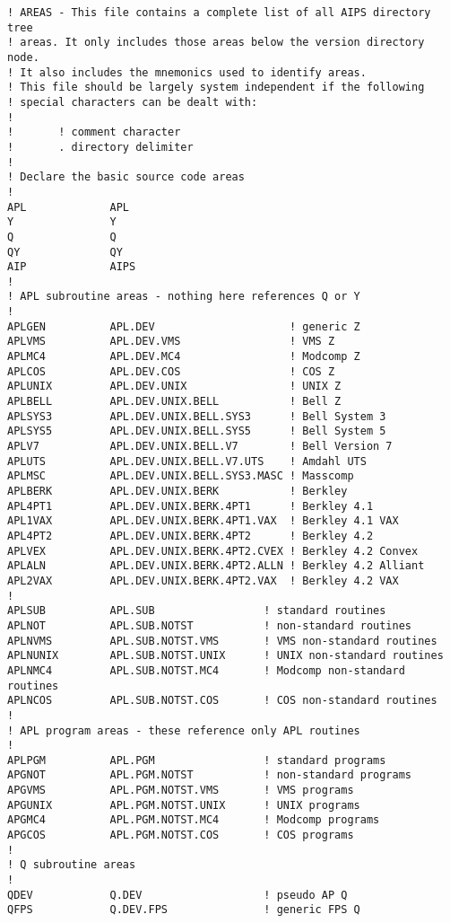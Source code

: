\begin{verbatim}
! AREAS - This file contains a complete list of all AIPS directory tree
! areas. It only includes those areas below the version directory node.
! It also includes the mnemonics used to identify areas.
! This file should be largely system independent if the following
! special characters can be dealt with:
!
!       ! comment character
!       . directory delimiter
!
! Declare the basic source code areas
!
APL             APL
Y               Y
Q               Q
QY              QY
AIP             AIPS
!
! APL subroutine areas - nothing here references Q or Y
!
APLGEN          APL.DEV                     ! generic Z
APLVMS          APL.DEV.VMS                 ! VMS Z
APLMC4          APL.DEV.MC4                 ! Modcomp Z
APLCOS          APL.DEV.COS                 ! COS Z
APLUNIX         APL.DEV.UNIX                ! UNIX Z
APLBELL         APL.DEV.UNIX.BELL           ! Bell Z
APLSYS3         APL.DEV.UNIX.BELL.SYS3      ! Bell System 3
APLSYS5         APL.DEV.UNIX.BELL.SYS5      ! Bell System 5
APLV7           APL.DEV.UNIX.BELL.V7        ! Bell Version 7
APLUTS          APL.DEV.UNIX.BELL.V7.UTS    ! Amdahl UTS
APLMSC          APL.DEV.UNIX.BELL.SYS3.MASC ! Masscomp
APLBERK         APL.DEV.UNIX.BERK           ! Berkley
APL4PT1         APL.DEV.UNIX.BERK.4PT1      ! Berkley 4.1
APL1VAX         APL.DEV.UNIX.BERK.4PT1.VAX  ! Berkley 4.1 VAX
APL4PT2         APL.DEV.UNIX.BERK.4PT2      ! Berkley 4.2
APLVEX          APL.DEV.UNIX.BERK.4PT2.CVEX ! Berkley 4.2 Convex
APLALN          APL.DEV.UNIX.BERK.4PT2.ALLN ! Berkley 4.2 Alliant
APL2VAX         APL.DEV.UNIX.BERK.4PT2.VAX  ! Berkley 4.2 VAX
!
APLSUB          APL.SUB                 ! standard routines
APLNOT          APL.SUB.NOTST           ! non-standard routines
APLNVMS         APL.SUB.NOTST.VMS       ! VMS non-standard routines
APLNUNIX        APL.SUB.NOTST.UNIX      ! UNIX non-standard routines
APLNMC4         APL.SUB.NOTST.MC4       ! Modcomp non-standard routines
APLNCOS         APL.SUB.NOTST.COS       ! COS non-standard routines
!
! APL program areas - these reference only APL routines
!
APLPGM          APL.PGM                 ! standard programs
APGNOT          APL.PGM.NOTST           ! non-standard programs
APGVMS          APL.PGM.NOTST.VMS       ! VMS programs
APGUNIX         APL.PGM.NOTST.UNIX      ! UNIX programs
APGMC4          APL.PGM.NOTST.MC4       ! Modcomp programs
APGCOS          APL.PGM.NOTST.COS       ! COS programs
!
! Q subroutine areas
!
QDEV            Q.DEV                   ! pseudo AP Q
QFPS            Q.DEV.FPS               ! generic FPS Q

\end{verbatim}
